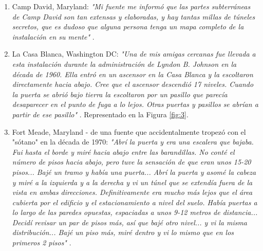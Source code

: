 \documentclass[10pt,twocolumn,letterpaper]{article}
\begin{document}
\begin{flushleft}
\begin{enumerate}
    \item Camp David, Maryland: \textit{"Mi fuente me informó que las partes subterráneas de Camp David son tan extensas y elaboradas, y hay tantas millas de túneles secretos, que es dudoso que alguna persona tenga un mapa completo de la instalación en su mente"} \cite{22}.
    \item La Casa Blanca, Washington DC: \textit{"Una de mis amigas cercanas fue llevada a esta instalación durante la administración de Lyndon B. Johnson en la década de 1960. Ella entró en un ascensor en la Casa Blanca y la escoltaron directamente hacia abajo. Cree que el ascensor descendió 17 niveles. Cuando la puerta se abrió bajo tierra la escoltaron por un pasillo que parecía desaparecer en el punto de fuga a lo lejos. Otras puertas y pasillos se abrían a partir de ese pasillo"} \cite{22}. Representado en la Figura \ref{fig:3}.
    \item Fort Meade, Maryland - de una fuente que accidentalmente tropezó con el "sótano" en la década de 1970: \textit{"Abrí la puerta y era una escalera que bajaba. Fui hasta el borde y miré hacia abajo entre las barandillas. No conté el número de pisos hacia abajo, pero tuve la sensación de que eran unos 15-20 pisos... Bajé un tramo y había una puerta... Abrí la puerta y asomé la cabeza y miré a la izquierda y a la derecha y vi un túnel que se extendía fuera de la vista en ambas direcciones. Definitivamente era mucho más lejos que el área cubierta por el edificio y el estacionamiento a nivel del suelo. Había puertas a lo largo de las paredes opuestas, espaciadas a unos 9-12 metros de distancia... Decidí revisar un par de pisos más, así que bajé otro nivel... y vi la misma distribución... Bajé un piso más, miré dentro y vi lo mismo que en los primeros 2 pisos"} \cite{22}.
\end{enumerate}
\end{flushleft}
\end{document}
